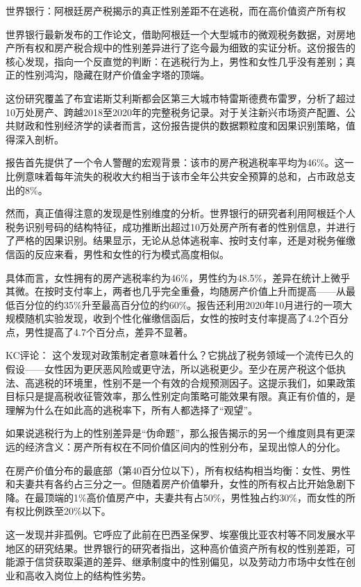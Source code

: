 \documentclass[11pt]{ctexart}
\begin{document}
世界银行：阿根廷房产税揭示的真正性别差距不在逃税，而在高价值资产所有权

世界银行最新发布的工作论文，借助阿根廷一个大型城市的微观税务数据，对房地产所有权和房产税合规中的性别差异进行了迄今最为细致的实证分析。这份报告的核心发现，指向一个反直觉的判断：在逃税行为上，男性和女性几乎没有差别；真正的性别鸿沟，隐藏在财产价值金字塔的顶端。

这份研究覆盖了布宜诺斯艾利斯都会区第三大城市特雷斯德费布雷罗，分析了超过10万处房产、跨越2018至2020年的完整税务记录。对于关注新兴市场资产配置、公共财政和性别经济学的读者而言，这份报告提供的数据颗粒度和因果识别策略，值得深入剖析。

报告首先提供了一个令人警醒的宏观背景：该市的房产税逃税率平均为46\%。这一比例意味着每年流失的税收大约相当于该市全年公共安全预算的总和，占市政总支出的8\%。

然而，真正值得注意的发现是性别维度的分析。世界银行的研究者利用阿根廷个人税务识别号码的结构特征，成功推断出超过10万处房产所有者的性别信息，并进行了严格的因果识别。结果显示，无论从总体逃税率、按时支付率，还是对税务催缴信函的反应来看，男性和女性的行为模式高度相似。

具体而言，女性拥有的房产逃税率约为46\%，男性约为48.5\%，差异在统计上微乎其微。在按时支付率上，两者也几乎完全重叠，均随房产价值上升而提高——从最低百分位的约35\%升至最高百分位的约60\%。报告还利用2020年10月进行的一项大规模随机实验发现，收到个性化催缴信函后，女性的按时支付率提高了4.2个百分点，男性提高了4.7个百分点，差异不显著。

KC评论： 这个发现对政策制定者意味着什么？它挑战了税务领域一个流传已久的假设——女性因为更厌恶风险或更守法，所以逃税更少。至少在房产税这个低执法、高逃税的环境里，性别不是一个有效的合规预测因子。这提示我们，如果政策目标只是提高税收征管效率，那么性别定向策略可能效果有限。真正有价值的，是理解为什么在如此高的逃税率下，所有人都选择了“观望”。

如果说逃税行为上的性别差异是“伪命题”，那么报告揭示的另一个维度则具有更深远的经济含义：房产所有权在不同价值区间内的性别分布，呈现出惊人的分化。

在房产价值分布的最底部（第40百分位以下），所有权结构相当均衡：女性、男性和夫妻共有各约占三分之一。但随着房产价值攀升，女性的所有权占比开始急剧下降。在最顶端的1\%高价值房产中，夫妻共有占50\%，男性独占约30\%，而女性的所有权比例跌至20\%以下。

这一发现并非孤例。它呼应了此前在巴西圣保罗、埃塞俄比亚农村等不同发展水平地区的研究结果。世界银行的研究者指出，这种高价值资产所有权的性别差距，可能源于信贷获取渠道的差异、继承制度中的性别偏见，以及劳动力市场中女性在创业和高收入岗位上的结构性劣势。
\end{document}
